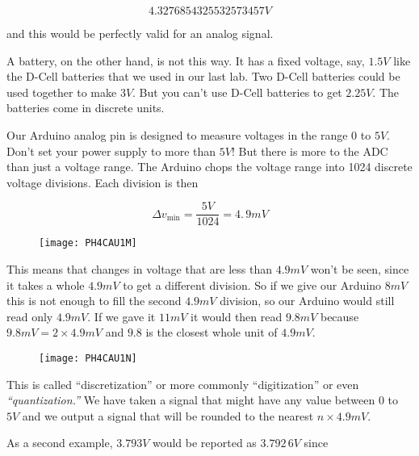 \begin{equation*}
	4.3276854325532573457\unit{V}
\end{equation*}

and this would be perfectly valid for an analog signal.

A battery, on the other hand, is not this way. It has a fixed voltage, say, $1.5\unit{V}$ like the D-Cell batteries that we used in our last lab. Two D-Cell batteries could be used together to make $3\unit{V}.$ But you can't use D-Cell batteries to get $2.25\unit{V}.$ The batteries come in discrete units.

Our Arduino analog pin is designed to measure voltages in the range $0$ to $5\unit{V}.$ Don't set your power supply to more than $5\unit{V}!$ But there is more to the ADC than just a voltage range. The Arduino chops the voltage range into 1024 discrete voltage divisions. Each division is then

\begin{equation*}
	\Delta v_{\min }=\frac{5\unit{V}}{1024}=4.\,\allowbreak 9\unit{mV}
\end{equation*}

\begin{figure}[h!]
	\centering
	\texttt{[image: PH4CAU1M]}
\end{figure} 

This means that changes in
voltage that are less than $4.9\unit{mV}$ won't be seen, since it takes a whole $4.9\unit{mV}$ to get a different division. So if we give our Arduino $8\unit{mV}$ this is not enough to fill the second $4.9\unit{mV}$ division, so our Arduino would still read only $4.9\unit{mV}.$ If we gave it $11\unit{mV}$ it would then read $9.8\unit{mV}$ because $9.8\unit{mV}=2\times 4.9 \unit{mV}$ and $9.8$ is the closest whole unit of $4.9\unit{mV}.$

\begin{figure}[h!]
    \centering
    \texttt{[image: PH4CAU1N]}
\end{figure}

This is called ``discretization'' or more commonly ``digitization'' or even \emph{``quantization.'' } We have taken a signal that might have any value between $0$ to $5\unit{V}$ and we output a signal that will be rounded to the nearest $n\times 4.9\unit{mV}.$

As a second example, $3.793\unit{V}$ would be reported as $\allowbreak 3.792\,\allowbreak 6\unit{V}$ since 

